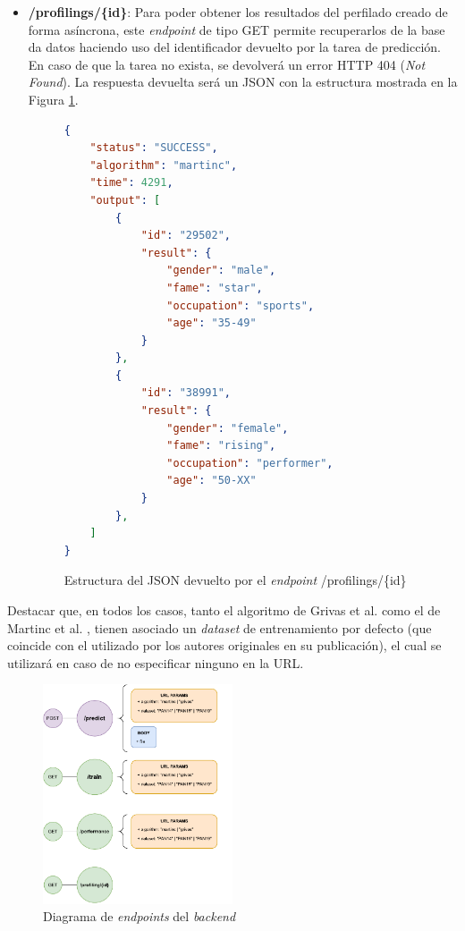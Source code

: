 \begin{itemize}
	\item \textbf{/profilings/\{id\}}: Para poder obtener los resultados del perfilado creado de forma asíncrona, este \textit{endpoint} de tipo GET
		permite recuperarlos de la base da datos haciendo uso del identificador devuelto por la tarea de predicción. En caso de que la tarea
		no exista, se devolverá un error HTTP 404 (\textit{Not Found}). La respuesta devuelta será un JSON con la estructura mostrada en la Figura \ref{fig:profiling_json}.

		\begin{figure}[H]
			\begin{lstlisting}[language=json]
{
	"status": "SUCCESS",
	"algorithm": "martinc",
	"time": 4291,
	"output": [
		{
			"id": "29502",
			"result": {
				"gender": "male",
				"fame": "star",
				"occupation": "sports",
				"age": "35-49"
			}
		},
		{
			"id": "38991",
			"result": {
				"gender": "female",
				"fame": "rising",
				"occupation": "performer",
				"age": "50-XX"
			}
		},
	]
}\end{lstlisting}
			\caption{Estructura del JSON devuelto por el \textit{endpoint} /profilings/\{id\}}
			\label{fig:profiling_json}
		\end{figure}
\end{itemize}

Destacar que, en todos los casos, tanto el algoritmo de Grivas et al. \cite{grivas2015author} como el de Martinc et al. \cite{martinc2019hot}, tienen asociado un \textit{dataset} de entrenamiento por defecto (que coincide
con el utilizado por los autores originales en su publicación), el cual se utilizará en caso de no especificar ninguno en la URL.

\begin{figure}[H]
	\centering
	\includegraphics[width=0.5\textwidth]{diagramas/endpoints.pdf}
	\caption{Diagrama de \textit{endpoints} del \textit{backend}}
	\label{fig:implementacion_endpoints}
\end{figure}

